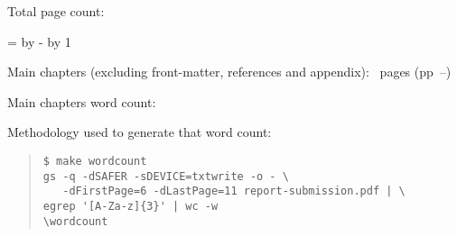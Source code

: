\ifsubmission

\begin{defaultsffamily} %
Total page count: \pageref{LastPage}

\makeatletter
\@tempcnta=\relax%
\advance\@tempcnta by -%
\advance\@tempcnta by 1%
\xdef\contentpages{\the\@tempcnta}%
\makeatother

Main chapters (excluding front-matter, references and appendix):
\contentpages~pages
(pp~\pageref{firstcontentpage}--\pageref{lastcontentpage})

Main chapters word count: \wordcount

\vspace*{1em}
Methodology used to generate that word count:

\begin{quote}
\begin{verbatim}
$ make wordcount
gs -q -dSAFER -sDEVICE=txtwrite -o - \
   -dFirstPage=6 -dLastPage=11 report-submission.pdf | \
egrep '[A-Za-z]{3}' | wc -w
\wordcount
\end{verbatim}
\end{quote}

\end{defaultsffamily}
\vspace{\fill}
\onehalfspacing






\else

